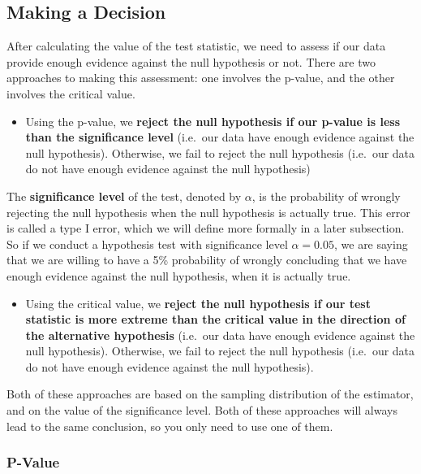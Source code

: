 \documentclass[
]{book}
\providecommand{\tightlist}{%
  \setlength{\itemsep}{0pt}\setlength{\parskip}{0pt}}
\begin{document}
\hypertarget{decision}{%
\subsection{Making a Decision}\label{decision}}

After calculating the value of the test statistic, we need to assess if our data provide enough evidence against the null hypothesis or not. There are two approaches to making this assessment: one involves the p-value, and the other involves the critical value.

\begin{itemize}
\tightlist
\item
  Using the p-value, we \textbf{reject the null hypothesis if our p-value is less than the significance level} (i.e.~our data have enough evidence against the null hypothesis). Otherwise, we fail to reject the null hypothesis (i.e.~our data do not have enough evidence against the null hypothesis)
\end{itemize}

The \textbf{significance level} of the test, denoted by \(\alpha\), is the probability of wrongly rejecting the null hypothesis when the null hypothesis is actually true. This error is called a type I error, which we will define more formally in a later subsection. So if we conduct a hypothesis test with significance level \(\alpha = 0.05\), we are saying that we are willing to have a 5\% probability of wrongly concluding that we have enough evidence against the null hypothesis, when it is actually true.

\begin{itemize}
\tightlist
\item
  Using the critical value, we \textbf{reject the null hypothesis if our test statistic is more extreme than the critical value in the direction of the alternative hypothesis} (i.e.~our data have enough evidence against the null hypothesis). Otherwise, we fail to reject the null hypothesis (i.e.~our data do not have enough evidence against the null hypothesis).
\end{itemize}

Both of these approaches are based on the sampling distribution of the estimator, and on the value of the significance level. Both of these approaches will always lead to the same conclusion, so you only need to use one of them.

\hypertarget{p-value}{%
\subsubsection{P-Value}\label{p-value}}
\end{document}
